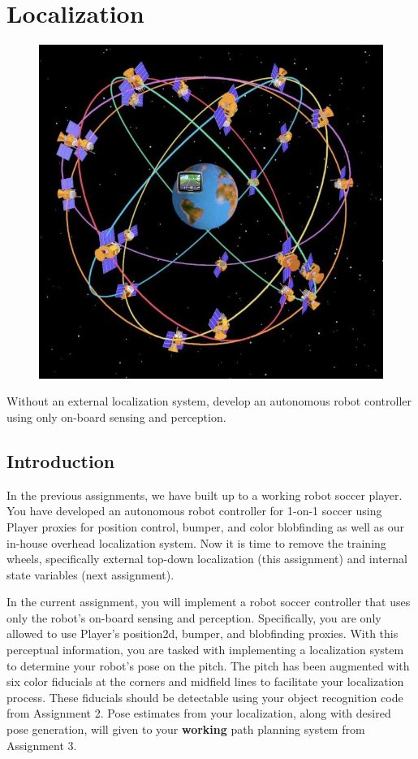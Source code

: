 

\chapter{Localization}
\label{sec:localization}

\begin{figure}[!h]
\centering
\includegraphics[width=0.9\columnwidth]{figures/8_teaser.jpg}
\end{figure}

\newpage

Without an external localization system, develop an autonomous robot controller using only on-board sensing and perception. 

\section{Introduction}

\vspace{0.5cm}
\noindent In the previous assignments, we have built up to a working robot soccer player.  You have developed an autonomous robot controller for 1-on-1 soccer using Player proxies for position control, bumper, and color blobfinding as well as our in-house overhead localization system.  Now it is time to remove the training wheels, specifically external top-down localization (this assignment) and internal state variables (next assignment).  

In the current assignment, you will implement a robot soccer controller that uses only the robot's on-board sensing and perception.  Specifically, you are only allowed to use Player's position2d, bumper, and blobfinding proxies.  With this perceptual information, you are tasked with implementing a localization system to determine your robot's pose on the pitch.  The pitch has been augmented with six color fiducials at the corners and midfield lines to facilitate your localization process.  These fiducials should be detectable using your object recognition code from Assignment 2.  Pose estimates from your localization, along with desired pose generation, will given to your {\bf working} path planning system from Assignment 3. 


